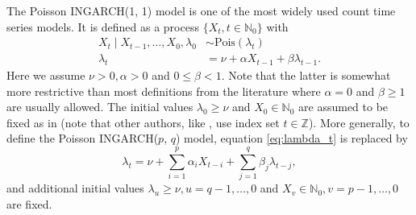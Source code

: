 \documentclass[review]{elsarticle}
\begin{document}
The Poisson INGARCH(1, 1) model \cite{Ferland2006, Fokianos2009} is one of the most widely used count time series models. It is defined as a process $\{X_t, t \in \mathbb{N}_0\}$ with
\begin{align}
X_t \mid X_{t - 1}, \dots, X_0, \lambda_0 & \sim \text{Pois}(\lambda_t)\label{eq:X_t_original}\\
\lambda_t & = \nu + \alpha X_{t - 1} + \beta \lambda_{t - 1}. \label{eq:lambda_t}
\end{align}
Here we assume $\nu > 0, \alpha > 0$ and $0 \leq \beta < 1$. Note that the latter is somewhat more restrictive than most definitions from the literature where $\alpha = 0$ and $\beta \geq 1$ are usually allowed. The initial values $\lambda_0 \geq \nu$ and $X_0 \in \mathbb{N}_0$ are assumed to be fixed as in \cite{Fokianos2009} (note that other authors, like \citep{Ferland2006}, use index set $t \in \mathbb{Z}$). More generally, to define the Poisson INGARCH($p$, $q$) model, equation \eqref{eq:lambda_t} is replaced by
\begin{equation}
\lambda_t = \nu + \sum_{i = 1}^p \alpha_i X_{t - i} + \sum_{j = 1}^q \beta_j \lambda_{t - j},\label{eq:lambda_t_pq}
\end{equation}
and additional initial values $\lambda_{u} \geq \nu, u = q - 1, \dots, 0$ and $X_{v} \in \mathbb{N}_0, v = p - 1, \dots, 0$ are fixed.
\end{document}
